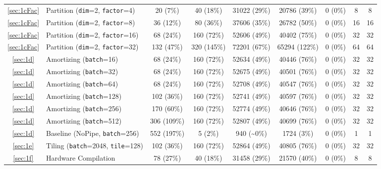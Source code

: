{\begin{tabularx}{\textwidth}{cl*{5}{c}*{2}{C}}
\ref{sec:1cFac}                     & Partition (\texttt{dim}=2, \texttt{factor}=4) & 20 (7\%) & 40 (18\%) & 31022 (29\%) & 20786 (39\%) & 0 (0\%) & 8 & 8 \\
\ref{sec:1cFac}                     & Partition (\texttt{dim}=2, \texttt{factor}=8) & 36 (12\%) & 80 (36\%) & 37606 (35\%) & 26782 (50\%) & 0 (0\%) & 16 & 16 \\
\ref{sec:1cFac}   & Partition (\texttt{dim}=2, \texttt{factor}=16) & 68 (24\%) & 160 (72\%) & 52606 (49\%) & 40402 (75\%) & 0 (0\%) & 32 & 32 \\
\ref{sec:1cFac}                    & Partition (\texttt{dim}=2, \texttt{factor}=32) & 132 (47\%) & 320 (145\%) & 72201 (67\%) & 65294 (122\%) & 0 (0\%) & 64 & 64 \\
\ref{sec:1d}                             & Amortizing (\texttt{batch}=16) & 68 (24\%) & 160 (72\%) & 52634 (49\%) & 40446 (76\%) & 0 (0\%) & 32 & 32 \\
\ref{sec:1d}                             & Amortizing (\texttt{batch}=32) & 68 (24\%) & 160 (72\%) & 52675 (49\%) & 40501 (76\%) & 0 (0\%) & 32 & 32 \\
\ref{sec:1d}                             & Amortizing (\texttt{batch}=64) & 68 (24\%) & 160 (72\%) & 52708 (49\%) & 40547 (76\%) & 0 (0\%) & 32 & 32 \\
\ref{sec:1d}                            & Amortizing (\texttt{batch}=128) & 102 (36\%) & 160 (72\%) & 52741 (49\%) & 40597 (76\%) & 0 (0\%) & 32 & 32 \\
\ref{sec:1d}           & Amortizing (\texttt{batch}=256) & 170 (60\%) & 160 (72\%) & 52774 (49\%) & 40646 (76\%) & 0 (0\%) & 32 & 32 \\
\ref{sec:1d}                            & Amortizing (\texttt{batch}=512) & 306 (109\%) & 160 (72\%) & 52807 (49\%) & 40699 (76\%) & 0 (0\%) & 32 & 32 \\
\ref{sec:1d}                              & Baseline (NoPipe, \texttt{batch}=256) & 552 (197\%) & 5 (2\%) & 940 (\textasciitilde 0\%) & 1724 (3\%) & 0 (0\%) & 1 & 1 \\
\ref{sec:1e}                                     & Tiling (\texttt{batch}=2048, \texttt{tile}=128) & 102 (36\%) & 160 (72\%) & 52864 (49\%) & 40805 (76\%) & 0 (0\%) & 32 & 32 \\
\ref{sec:1f}                                & Hardware Compilation & 78 (27\%) & 40 (18\%) & 31458 (29\%) & 21570 (40\%) & 0 (0\%) & 8 & 8 \\
    \bottomrule
\end{tabularx}
}
